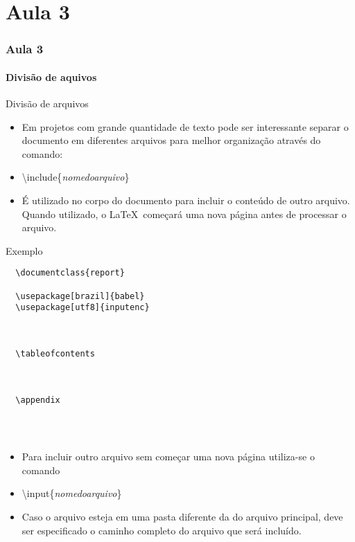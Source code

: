 \part{Aula 3}
\section{Aula 3}

\subsection{Divisão de aquivos}
\begin{frame}{Divisão de arquivos}

    \begin{itemize}
    \item Em projetos com grande quantidade de texto pode ser interessante separar o documento em diferentes arquivos para melhor organização através do comando:    
    \item[] \alert{\textbackslash include\{\textit{nomedoarquivo}\}}
    \item É utilizado no corpo do documento para incluir o conteúdo de outro arquivo. Quando utilizado, o \LaTeX\ começará uma nova página antes de processar o arquivo.
    \end{itemize}

    \begin{exampleblock}{Exemplo}
    {\footnotesize
\begin{verbatim}
  \documentclass{report}
  
  \usepackage[brazil]{babel}
  \usepackage[utf8]{inputenc}
  
  
  
  \tableofcontents
  
  
  
  \appendix
  
  
  
\end{verbatim}
    }
    \end{exampleblock}

    \newpage

    \begin{itemize}
    \item Para incluir outro arquivo sem começar uma nova página utiliza-se o comando
    \item[] \alert{\textbackslash input\{\textit{nomedoarquivo}\}}
    \item Caso o arquivo esteja em uma pasta diferente da do arquivo principal, deve ser especificado o caminho completo do arquivo que será incluído.
    \end{itemize}

\end{frame}
  
